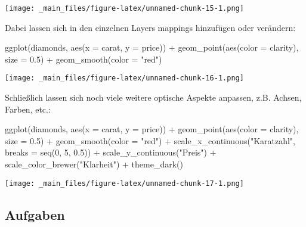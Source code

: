 \documentclass[
  ngerman,
]{article}
\newenvironment{Shaded}{\begin{snugshade}}{\end{snugshade}}
\newcommand{\AttributeTok}[1]{\textcolor[rgb]{0.77,0.63,0.00}{#1}}
\newcommand{\DecValTok}[1]{\textcolor[rgb]{0.00,0.00,0.81}{#1}}
\newcommand{\FloatTok}[1]{\textcolor[rgb]{0.00,0.00,0.81}{#1}}
\newcommand{\FunctionTok}[1]{\textcolor[rgb]{0.00,0.00,0.00}{#1}}
\newcommand{\NormalTok}[1]{#1}
\newcommand{\SpecialCharTok}[1]{\textcolor[rgb]{0.00,0.00,0.00}{#1}}
\newcommand{\StringTok}[1]{\textcolor[rgb]{0.31,0.60,0.02}{#1}}
\begin{document}
\texttt{[image: \_main\_files/figure-latex/unnamed-chunk-15-1.png]}

Dabei lassen sich in den einzelnen Layers mappings hinzufügen oder verändern:

\begin{Shaded}
\begin{Highlighting}[]
\FunctionTok{ggplot}\NormalTok{(diamonds, }\FunctionTok{aes}\NormalTok{(}\AttributeTok{x =}\NormalTok{ carat, }\AttributeTok{y =}\NormalTok{ price)) }\SpecialCharTok{+}
  \FunctionTok{geom\_point}\NormalTok{(}\FunctionTok{aes}\NormalTok{(}\AttributeTok{color =}\NormalTok{ clarity), }\AttributeTok{size =} \FloatTok{0.5}\NormalTok{) }\SpecialCharTok{+}
  \FunctionTok{geom\_smooth}\NormalTok{(}\AttributeTok{color =} \StringTok{"red"}\NormalTok{)}
\end{Highlighting}
\end{Shaded}

\texttt{[image: \_main\_files/figure-latex/unnamed-chunk-16-1.png]}

Schließlich lassen sich noch viele weitere optische Aspekte anpassen, z.B. Achsen, Farben, etc.:

\begin{Shaded}
\begin{Highlighting}[]
\FunctionTok{ggplot}\NormalTok{(diamonds, }\FunctionTok{aes}\NormalTok{(}\AttributeTok{x =}\NormalTok{ carat, }\AttributeTok{y =}\NormalTok{ price)) }\SpecialCharTok{+}
  \FunctionTok{geom\_point}\NormalTok{(}\FunctionTok{aes}\NormalTok{(}\AttributeTok{color =}\NormalTok{ clarity), }\AttributeTok{size =} \FloatTok{0.5}\NormalTok{) }\SpecialCharTok{+}
  \FunctionTok{geom\_smooth}\NormalTok{(}\AttributeTok{color =} \StringTok{"red"}\NormalTok{) }\SpecialCharTok{+}
  \FunctionTok{scale\_x\_continuous}\NormalTok{(}\StringTok{"Karatzahl"}\NormalTok{, }\AttributeTok{breaks =} \FunctionTok{seq}\NormalTok{(}\DecValTok{0}\NormalTok{, }\DecValTok{5}\NormalTok{, }\FloatTok{0.5}\NormalTok{)) }\SpecialCharTok{+}
  \FunctionTok{scale\_y\_continuous}\NormalTok{(}\StringTok{"Preis"}\NormalTok{) }\SpecialCharTok{+}
  \FunctionTok{scale\_color\_brewer}\NormalTok{(}\StringTok{"Klarheit"}\NormalTok{) }\SpecialCharTok{+}
  \FunctionTok{theme\_dark}\NormalTok{()}
\end{Highlighting}
\end{Shaded}

\texttt{[image: \_main\_files/figure-latex/unnamed-chunk-17-1.png]}

\hypertarget{aufgaben}{%
\subsection{Aufgaben}\label{aufgaben}}
\end{document}
